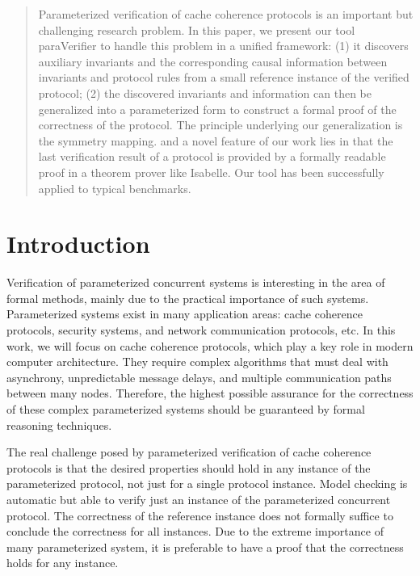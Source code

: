 \begin{abstract}
Parameterized verification of cache coherence protocols is an important
but challenging research problem.  In this paper, we present our tool {\sf paraVerifier}
to handle this problem in a unified framework: (1) it discovers auxiliary invariants and the
corresponding causal information between invariants and protocol rules from a
small reference instance of the verified protocol; (2) the discovered
invariants and information can then be generalized into a parameterized
form to construct a formal proof of the correctness of the protocol.
The principle underlying our generalization is the symmetry mapping.
and a novel feature of our work lies in that the last verification result of a
protocol is provided by a formally readable proof in a theorem prover like Isabelle.
Our tool has been successfully applied to typical benchmarks. 

\end{abstract}

\section{Introduction}
Verification of parameterized concurrent systems is interesting in
the area of formal methods, mainly due to the practical importance
of such systems. Parameterized systems exist in many
application areas: cache coherence protocols, security systems, and
network communication protocols, etc. In this work, we will
focus on cache coherence protocols, which play a key role in modern
computer architecture. They require complex algorithms that must
deal with asynchrony, unpredictable message delays, and multiple
communication paths between many nodes. Therefore, the highest
possible assurance for the correctness of these complex
parameterized systems should be guaranteed by formal reasoning
techniques.

The real challenge posed by parameterized verification of cache coherence protocols
is that the desired properties should hold in any instance of the parameterized
protocol, not just for a single protocol instance. Model checking is
automatic but able to verify just an instance of the parameterized
concurrent protocol. The correctness of the reference instance does
not formally suffice to conclude the correctness for all instances.
Due to the extreme importance of many parameterized system, it is
preferable to have a proof that the correctness holds for any
instance.

